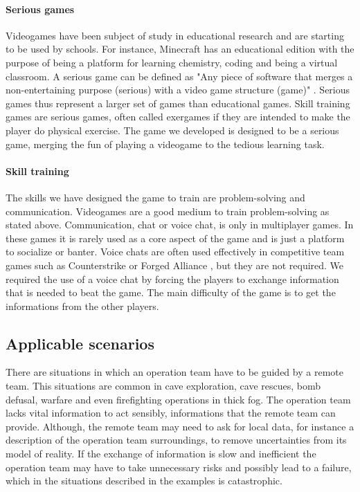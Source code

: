 \documentclass[12pt]{article}
\begin{document}
\paragraph{Serious games}
Videogames have been subject of study in educational research and are starting to be used by schools. For instance, Minecraft \cite{minecraft} has an educational edition with the purpose of being a platform for learning chemistry, coding and being a virtual classroom. A serious game can be defined as "Any piece of software that merges a non-entertaining purpose (serious) with a video game structure (game)" \cite{serious}. Serious games thus represent a larger set of games than educational games. Skill training games are serious games, often called exergames if they are intended to make the player do physical exercise. The game we developed is designed to be a serious game, merging the fun of playing a videogame to the tedious learning task. 

\paragraph{Skill training} 
The skills we have designed the game to train are problem-solving and communication. Videogames are a good medium to train problem-solving as stated above. Communication, chat or voice chat, is only in multiplayer games. In these games it is rarely used as a core aspect of the game and is just a platform to socialize or banter. Voice chats are often used effectively in competitive team games such as Counterstrike \cite{counterstrike} or Forged Alliance \cite{faf}, but they are not required. We required the use of a voice chat by forcing the players to exchange information that is needed to beat the game. The main difficulty of the game is to get the informations from the other players. 

\subsection{Applicable scenarios}
There are situations in which an operation team have to be guided by a remote team. This situations are common in cave exploration, cave rescues, bomb defusal, warfare and even firefighting operations in thick fog. The operation team lacks vital information to act sensibly, informations that the remote team can provide. Although, the remote team may need to ask for local data, for instance a description of the operation team surroundings, to remove uncertainties from its model of reality. If the exchange of information is slow and inefficient the operation team may have to take unnecessary risks and possibly lead to a failure, which in the situations described in the examples is catastrophic.
\end{document}
